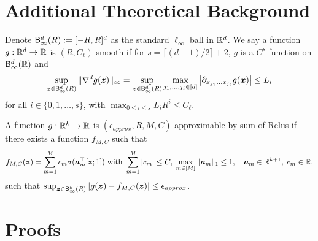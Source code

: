 \appendix






\section{Additional Theoretical Background}

\begin{definition}
    Denote $\mathsf{B}_{\infty}^d(R):=[-R,R]^d$ as the standard $\ell_\infty$ ball in $\mathbb{R}^d$.
    We say a function $g:\mathbb{R}^d\to\mathbb{R}$ is $(R,C_\ell)$ smooth if for $s=\lceil(d-1)/2\rceil+2$, $g$ is a $C^s$ function on $\mathsf{B}^d_\infty(\mathbb{R})$ and
    \begin{align*}
        \sup_{\boldsymbol{z}\in\mathsf{B}_{\infty}^d(R)}\Vert\nabla^dg(\boldsymbol{z})\Vert_{\infty}=\sup_{\boldsymbol{z}\in\mathsf{B}^d_\infty(R)}\max_{j_1,\ldots,j_i\in[d]}\left|\partial_{x_{j_1}\ldots x_{j_{i}}}g(\boldsymbol{x})\right|\leq L_i
    \end{align*}
    for all $i\in\{0,1,\ldots,s\}$, with $\max_{0\leq i\leq s}L_iR^i\leq C_\ell$.
\end{definition}
\begin{definition}\label{def6} A function $g:\mathbb{R}^k\to\mathbb{R}$ is $(\epsilon_{approx}, R,M,C)$-approximable by sum of Relus if there exists a function $f_{M,C}$ such that
\begin{align*}
    f_{M,C}(\boldsymbol{z})=\sum_{m=1}^Mc_m\sigma(\boldsymbol{a}_m^\top[\boldsymbol{z};1])\text{ with }\sum_{m=1}^M|c_m|\leq C,\;\max_{m\in[M]}\Vert \boldsymbol{a}_m\Vert_1\leq 1,\quad \boldsymbol{a}_m\in\mathbb{R}^{k+1},\; c_m\in\mathbb{R},
\end{align*}
such that $\sup_{\boldsymbol{z}\in\mathsf{B}_\infty^k(R)}|g(\boldsymbol{z})-f_{M,C}(\boldsymbol{z})|\leq \epsilon_{approx}$.
\end{definition}



\section{Proofs}
